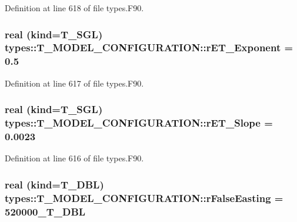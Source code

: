 Definition at line 618 of file types.F90.

\hypertarget{typetypes_1_1_t___m_o_d_e_l___c_o_n_f_i_g_u_r_a_t_i_o_n_ab81a4b730853a8dfc0262bf4cebac5f0}{
\subsubsection[{rET\_\-Exponent}]{\setlength{\rightskip}{0pt plus 5cm}real (kind={\bf T\_\-SGL}) {\bf types::T\_\-MODEL\_\-CONFIGURATION::rET\_\-Exponent} = 0.5}}
\label{typetypes_1_1_t___m_o_d_e_l___c_o_n_f_i_g_u_r_a_t_i_o_n_ab81a4b730853a8dfc0262bf4cebac5f0}


Definition at line 617 of file types.F90.

\hypertarget{typetypes_1_1_t___m_o_d_e_l___c_o_n_f_i_g_u_r_a_t_i_o_n_a95a4591a40aa58b67380dcbe6d7ee8c5}{
\subsubsection[{rET\_\-Slope}]{\setlength{\rightskip}{0pt plus 5cm}real (kind={\bf T\_\-SGL}) {\bf types::T\_\-MODEL\_\-CONFIGURATION::rET\_\-Slope} = 0.0023}}
\label{typetypes_1_1_t___m_o_d_e_l___c_o_n_f_i_g_u_r_a_t_i_o_n_a95a4591a40aa58b67380dcbe6d7ee8c5}


Definition at line 616 of file types.F90.

\hypertarget{typetypes_1_1_t___m_o_d_e_l___c_o_n_f_i_g_u_r_a_t_i_o_n_a01ee35fbc67c848ec9a41dd9df5af302}{
\subsubsection[{rFalseEasting}]{\setlength{\rightskip}{0pt plus 5cm}real (kind={\bf T\_\-DBL}) {\bf types::T\_\-MODEL\_\-CONFIGURATION::rFalseEasting} = 520000\_\-T\_\-DBL}}
\label{typetypes_1_1_t___m_o_d_e_l___c_o_n_f_i_g_u_r_a_t_i_o_n_a01ee35fbc67c848ec9a41dd9df5af302}


